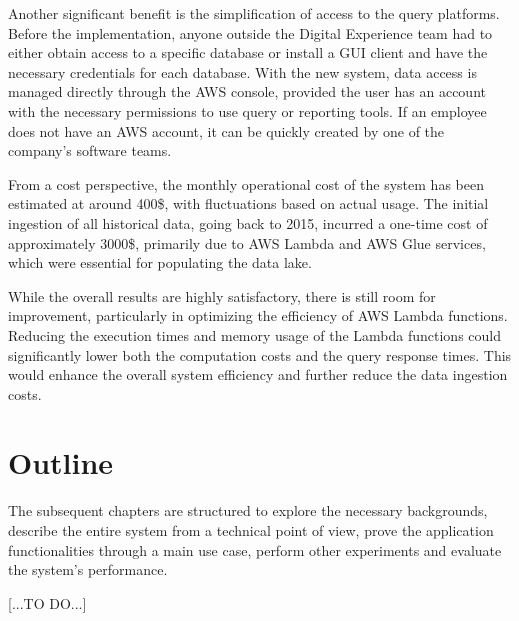 Another significant benefit is the simplification of access to the query platforms. Before the implementation, anyone outside the Digital Experience team had to either obtain access to a specific database or install a GUI client and have the necessary credentials for each database. With the new system, data access is managed directly through the \ac{AWS} console, provided the user has an account with the necessary permissions to use query or reporting tools. If an employee does not have an \ac{AWS} account, it can be quickly created by one of the company's software teams.

From a cost perspective, the monthly operational cost of the system has been estimated at around 400\$, with fluctuations based on actual usage. The initial ingestion of all historical data, going back to 2015, incurred a one-time cost of approximately 3000\$, primarily due to \ac{AWS} Lambda and \ac{AWS} Glue services, which were essential for populating the data lake.

While the overall results are highly satisfactory, there is still room for improvement, particularly in optimizing the efficiency of \ac{AWS} Lambda functions. Reducing the execution times and memory usage of the Lambda functions could significantly lower both the computation costs and the query response times. This would enhance the overall system efficiency and further reduce the data ingestion costs.
\section{Outline}
The subsequent chapters are structured to explore the necessary backgrounds, describe the entire system from a technical point of view, prove the application functionalities through a main use case, perform other experiments and evaluate the system's performance.

[...TO DO...]

